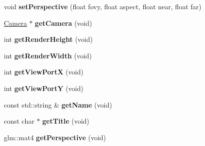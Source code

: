 \begin{DoxyCompactItemize}
\item 
\hypertarget{classEngine_1_1OpenPolygonDisplay_a28c69d28bec97bc043825095d8de13eb}{}void {\bfseries set\+Perspective} (float fovy, float aspect, float near, float far)\label{classEngine_1_1OpenPolygonDisplay_a28c69d28bec97bc043825095d8de13eb}

\item 
\hypertarget{classEngine_1_1OpenPolygonDisplay_ab0487fc26b1ca14425500991502eeb40}{}\hyperlink{classEngine_1_1Camera}{Camera} $\ast$ {\bfseries get\+Camera} (void)\label{classEngine_1_1OpenPolygonDisplay_ab0487fc26b1ca14425500991502eeb40}

\item 
\hypertarget{classEngine_1_1OpenPolygonDisplay_ad6a8931e89242a78ce14a9f2b3056813}{}int {\bfseries get\+Render\+Height} (void)\label{classEngine_1_1OpenPolygonDisplay_ad6a8931e89242a78ce14a9f2b3056813}

\item 
\hypertarget{classEngine_1_1OpenPolygonDisplay_a218d172912b295115b9d59184e4bde91}{}int {\bfseries get\+Render\+Width} (void)\label{classEngine_1_1OpenPolygonDisplay_a218d172912b295115b9d59184e4bde91}

\item 
\hypertarget{classEngine_1_1OpenPolygonDisplay_a0b81459f4aa0397147c3e6431bc68326}{}int {\bfseries get\+View\+Port\+X} (void)\label{classEngine_1_1OpenPolygonDisplay_a0b81459f4aa0397147c3e6431bc68326}

\item 
\hypertarget{classEngine_1_1OpenPolygonDisplay_a416ea86d55883718ede5f1796f5be1c5}{}int {\bfseries get\+View\+Port\+Y} (void)\label{classEngine_1_1OpenPolygonDisplay_a416ea86d55883718ede5f1796f5be1c5}

\item 
\hypertarget{classEngine_1_1OpenPolygonDisplay_af44b37c7fc64d58eb3ee4afc41fabef7}{}const std\+::string \& {\bfseries get\+Name} (void)\label{classEngine_1_1OpenPolygonDisplay_af44b37c7fc64d58eb3ee4afc41fabef7}

\item 
\hypertarget{classEngine_1_1OpenPolygonDisplay_ac66d54b60c7c2ccac4482d2af84ca05b}{}const char $\ast$ {\bfseries get\+Title} (void)\label{classEngine_1_1OpenPolygonDisplay_ac66d54b60c7c2ccac4482d2af84ca05b}

\item 
\hypertarget{classEngine_1_1OpenPolygonDisplay_a1364aa54d94fd6549beac09b03fe13c7}{}glm\+::mat4 {\bfseries get\+Perspective} (void)\label{classEngine_1_1OpenPolygonDisplay_a1364aa54d94fd6549beac09b03fe13c7}

\end{DoxyCompactItemize}
